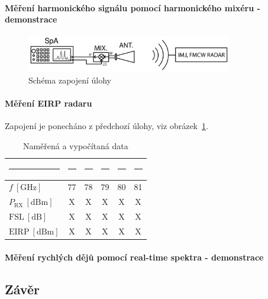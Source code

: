 \documentclass[11pt,a4paper]{article}
\begin{document}
\paragraph*{Měření harmonického signálu pomocí harmonického mixéru - demonstrace} \lipsum[1]
\begin{figure}[!ht]
    \centering
    \includegraphics[width=0.8\textwidth]{src/task3-zapojeni.png}
    \caption{Schéma zapojení úlohy}
    \label{fig:task3-zapojeni}
\end{figure}

\paragraph*{Měření EIRP radaru} Zapojení je ponecháno z předchozí úlohy, viz obrázek~\ref{fig:task3-zapojeni}.
\begin{table}[!ht]
    \centering
    \begin{tabular}{|l||c|c|c|c|c|}
        \rule{2cm}{0pt} & \rule{1cm}{0pt} & \rule{1cm}{0pt} & \rule{1cm}{0pt} & \rule{1cm}{0pt} & \rule{1cm}{0pt}\\[-\arraystretch\normalbaselineskip]
        \hline
        $f \ [\mathrm{GHz}]$ & 77 & 78 & 79 & 80 & 81\\
        \hline
        $P_{\mathrm{RX}} \ [\mathrm{dBm}]$ & X & X & X & X & X\\
        \hline
        $\mathrm{FSL} \ [\mathrm{dB}]$ & X & X & X & X & X\\
        \hline\hline
        $\mathrm{EIRP} \ [\mathrm{dBm}]$ & X & X & X & X & X\\
        \hline
    \end{tabular}
    \caption{Naměřená a vypočítaná data}
    \label{table:task4-data}
\end{table}

\paragraph*{Měření rychlých dějů pomocí real-time spektra - demonstrace} \lipsum[1]


\subsection*{Závěr}
\lipsum[1]
\end{document}
